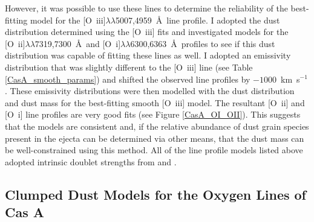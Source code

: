 However, it was possible to use these lines to determine the reliability of the best-fitting model for the  [O~{\sc iii}]$\lambda\lambda$5007,4959~\AA\  line profile.  I adopted the dust distribution determined using the [O~{\sc iii}] fits and investigated models for the [O~{\sc ii}]$\lambda\lambda$7319,7300~\AA\  and [O~{\sc i}]$\lambda\lambda$6300,6363~\AA\  profiles to see if this dust distribution was capable of fitting these lines as well.  I adopted an emissivity distribution that was slightly different to the [O~{\sc iii}] line (see Table \ref{CasA_smooth_params}) and shifted the observed line profiles by $-1000$~km~s$^{-1}$.  These emissivity distributions were then modelled with the dust distribution and dust mass for the best-fitting smooth [O~{\sc iii}] model.  The resultant [O~{\sc ii}] and [O~{\sc i}] line profiles are very good fits (see Figure \ref{CasA_OI_OII}).  This suggests that the models are consistent and, if the relative abundance of dust grain species present in the ejecta can be determined via other means, that the dust mass can be well-constrained using this method.  All of the line profile models listed above adopted intrinsic doublet strengths from \citet{Zeippen1987} and \citet{Storey2000}.  



\subsection{Clumped Dust Models for  the Oxygen Lines of Cas A}

